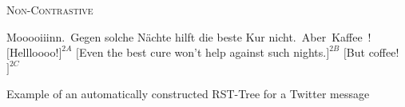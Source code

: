 {
\centering
\dirrel{}
        {}
        {\textsc{Non-Contrastive}}
        {
                {}
                {}
                {}}

\begin{flushleft}
\begin{rhetoricaltext}
\unit[1]{Mooooiiinn.}
\unit[2]{Gegen solche N\"achte hilft die beste Kur nicht.}
\unit[3]{Aber Kaffee!}
\\
$[$Hellloooo!$]^{2A}$ $[$Even the best cure won't help against such nights.$]^{2B}$ $[$But coffee!$]^{2C}$
\end{rhetoricaltext}
\end{flushleft}
\caption[Automatic RST tree for a tweet]{Example of an automatically constructed RST-Tree for a Twitter message}\label{dasa:fig:twitter-rst-tree}
}
